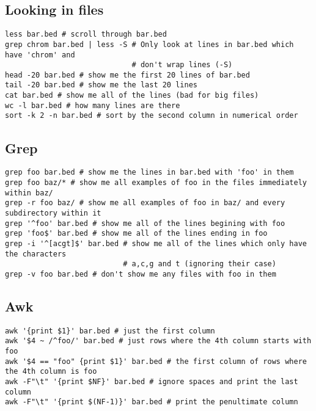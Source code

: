 \documentclass[11pt]{article}
\begin{document}
\hypertarget{looking-in-files}{%
\subsection{Looking in files}\label{looking-in-files}}

\begin{verbatim}
less bar.bed # scroll through bar.bed
grep chrom bar.bed | less -S # Only look at lines in bar.bed which have 'chrom' and
                             # don't wrap lines (-S)
head -20 bar.bed # show me the first 20 lines of bar.bed
tail -20 bar.bed # show me the last 20 lines
cat bar.bed # show me all of the lines (bad for big files)
wc -l bar.bed # how many lines are there
sort -k 2 -n bar.bed # sort by the second column in numerical order
\end{verbatim}

\hypertarget{grep}{%
\subsection{Grep}\label{grep}}

\begin{verbatim}
grep foo bar.bed # show me the lines in bar.bed with 'foo' in them
grep foo baz/* # show me all examples of foo in the files immediately within baz/
grep -r foo baz/ # show me all examples of foo in baz/ and every subdirectory within it
grep '^foo' bar.bed # show me all of the lines begining with foo
grep 'foo$' bar.bed # show me all of the lines ending in foo
grep -i '^[acgt]$' bar.bed # show me all of the lines which only have the characters
                           # a,c,g and t (ignoring their case)
grep -v foo bar.bed # don't show me any files with foo in them
\end{verbatim}

\hypertarget{awk}{%
\subsection{Awk}\label{awk}}

\begin{verbatim}
awk '{print $1}' bar.bed # just the first column
awk '$4 ~ /^foo/' bar.bed # just rows where the 4th column starts with foo
awk '$4 == "foo" {print $1}' bar.bed # the first column of rows where the 4th column is foo
awk -F"\t" '{print $NF}' bar.bed # ignore spaces and print the last column
awk -F"\t" '{print $(NF-1)}' bar.bed # print the penultimate column
\end{verbatim}
\end{document}
